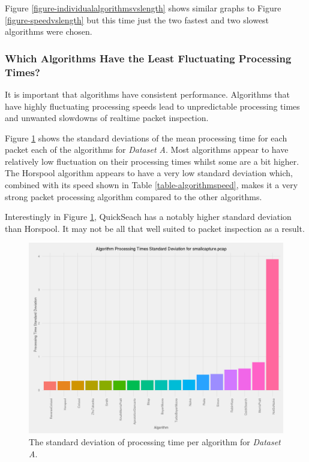 \documentclass[11pt]{article}
\begin{document}
Figure \ref{figure-individualalgorithmsvslength} shows similar graphs to Figure \ref{figure-speedvslength} but this time just the two fastest and two slowest algorithms were chosen.

\subsubsection{Which Algorithms Have the Least Fluctuating Processing Times?}

It is important that algorithms have consistent performance. Algorithms that have highly fluctuating processing speeds lead to unpredictable processing times and unwanted slowdowns of realtime packet inspection.

Figure \ref{figure-standarddeviation} shows the standard deviations of the mean processing time for each packet each of the algorithms for \textit{Dataset A}. Most algorithms appear to have relatively low fluctuation on their processing times whilst some are a bit higher. The Horspool \citep{horspool1980} algorithm appears to have a very low standard deviation which, combined with its speed shown in Table \ref{table-algorithmspeed}, makes it a very strong packet processing algorithm compared to the other algorithms.

Interestingly in Figure \ref{figure-standarddeviation}, QuickSeach has a notably higher standard deviation than Horspool. It may not be all that well suited to packet inspection as a result.

\begin{figure}[hbt]
  \includegraphics[width=\textwidth]{images/bar_graph_algorithm_standard_deviation_pcap}
  \caption{The standard deviation of processing time per algorithm for \textit{Dataset A}.}
  \label{figure-standarddeviation}
\end{figure}
\end{document}
